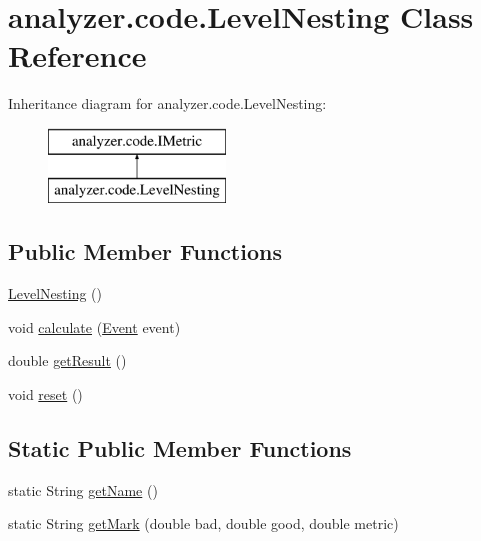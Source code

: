 \hypertarget{classanalyzer_1_1code_1_1LevelNesting}{}\section{analyzer.\+code.\+Level\+Nesting Class Reference}
\label{classanalyzer_1_1code_1_1LevelNesting}
Inheritance diagram for analyzer.\+code.\+Level\+Nesting\+:\begin{figure}[H]
\begin{center}
\leavevmode
\includegraphics[height=2.000000cm]{classanalyzer_1_1code_1_1LevelNesting}
\end{center}
\end{figure}
\subsection*{Public Member Functions}
\begin{DoxyCompactItemize}
\item 
\hyperlink{classanalyzer_1_1code_1_1LevelNesting_ae2b01629780a540f7e261ce2c59d654e}{Level\+Nesting} ()
\item 
void \hyperlink{classanalyzer_1_1code_1_1LevelNesting_a09431a19031d65f2e53257c9d10beb49}{calculate} (\hyperlink{classanalyzer_1_1code_1_1Event}{Event} event)
\item 
double \hyperlink{classanalyzer_1_1code_1_1LevelNesting_ab16151c8d69cb40a84d73b2a9574fd85}{get\+Result} ()
\item 
void \hyperlink{classanalyzer_1_1code_1_1LevelNesting_a5aeb52565e529607aa8a3b2bd4beb490}{reset} ()
\end{DoxyCompactItemize}
\subsection*{Static Public Member Functions}
\begin{DoxyCompactItemize}
\item 
static String \hyperlink{classanalyzer_1_1code_1_1LevelNesting_aea9db3974d2a58fb0b559c830a0386c1}{get\+Name} ()
\item 
static String \hyperlink{classanalyzer_1_1code_1_1LevelNesting_a6e56b6f52fc6eb7b5645ce24e5dfe370}{get\+Mark} (double bad, double good, double metric)
\end{DoxyCompactItemize}


